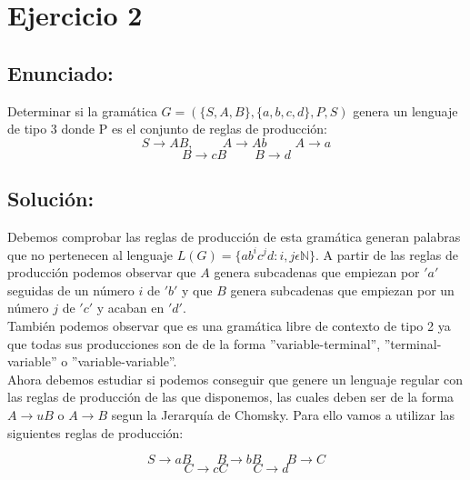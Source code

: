 \documentclass[10pt,a4paper,spanish]{report}
\begin{document}

\chapter{Ejercicio 2}
\section{Enunciado:}

\noindent
Determinar si la gramática $G = (\{S,A,B\}, \{a,b,c,d\}, P, S)$ genera un lenguaje de tipo 3 donde P es el conjunto de reglas de producción:
\begin{displaymath}
	S \rightarrow AB, \qquad\ A \rightarrow Ab \qquad\ A \rightarrow a
\end{displaymath}
\begin{displaymath}
	B \rightarrow cB \qquad\ B \rightarrow d
\end{displaymath}

\section{Solución:}

\noindent
Debemos comprobar las reglas de producción de esta gramática generan palabras que no pertenecen al lenguaje $L(G) = \{ab^ic^jd : i,j \epsilon \mathbb{N}\}$. A partir de las reglas de producción podemos observar que $A$ genera subcadenas que empiezan por $'a'$ seguidas de un número $i$ de $'b'$ y que $B$ genera subcadenas que empiezan por un número $j$ de $'c'$ y acaban en $'d'$. \\

\noindent
También podemos observar que es una gramática libre de contexto de tipo 2 ya que todas sus producciones son de de la forma ''variable-terminal'', ''terminal-variable'' o ''variable-variable''. \\

\noindent
Ahora debemos estudiar si podemos conseguir que genere un lenguaje regular con las reglas de producción de las que disponemos, las cuales deben ser de la forma $A \rightarrow uB$ o $A \rightarrow B$ segun la Jerarquía de Chomsky. Para ello vamos a utilizar las siguientes reglas de producción:

\begin{displaymath}
	S \rightarrow aB \qquad B \rightarrow bB \qquad B \rightarrow C
\end{displaymath}
\begin{displaymath}
	C \rightarrow cC \qquad C \rightarrow d
\end{displaymath}
\end{document}

